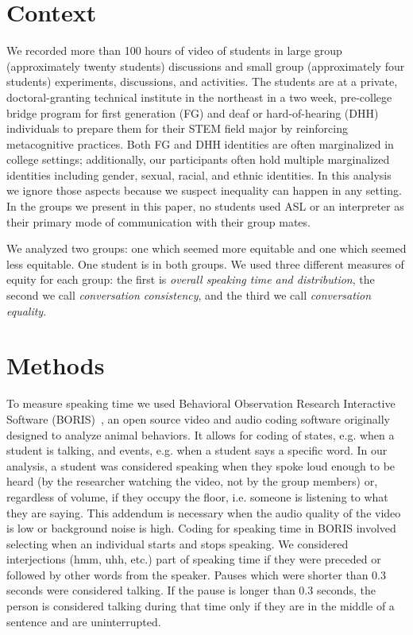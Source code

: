 \documentclass[aps,pra,reprint,noshowpacs,superscriptaddress, nofootinbib]{revtex4-1}
\begin{document}
\section{Context}

   We recorded more than 100 hours of video of students in large group (approximately twenty students) discussions and small group (approximately four students) experiments, discussions, and activities. The students are at a private, doctoral-granting technical institute in the northeast in a two week, pre-college bridge program for first generation (FG) and deaf or hard-of-hearing (DHH) individuals to prepare them for their STEM field major by reinforcing metacognitive practices. Both FG and DHH identities are often marginalized in college settings; additionally, our participants often hold multiple marginalized identities including gender, sexual, racial, and ethnic identities. In this analysis we ignore those aspects because we suspect inequality can happen in any setting. In the groups we present in this paper, no students used ASL or an interpreter as their primary mode of communication with their group mates. 
   
      We analyzed two groups: one which seemed more equitable and one which seemed less equitable. One student is in both groups. We used three different measures of equity for each group: the first is \textit{overall speaking time and distribution}, the second we call \textit{conversation consistency}, and the third we call \textit{conversation equality}.

\section{Methods}


To measure speaking time we used Behavioral Observation Research Interactive Software (BORIS)~\cite{friard_boris:_2016}, an open source video and audio coding software originally designed to analyze animal behaviors. It allows for coding of states, e.g. when a student is talking, and events, e.g. when a student says a specific word. In our analysis, a student was considered speaking when they spoke loud enough to be heard (by the researcher watching the video, not by the group members) or, regardless of volume, if they occupy the floor, i.e. someone is listening to what they are saying. This addendum is necessary when the audio quality of the video is low or background noise is high. Coding for speaking time in BORIS involved selecting when an individual starts and stops speaking. We considered interjections (hmm, uhh, etc.) part of speaking time if they were preceded or followed by other words from the speaker. Pauses which were shorter than 0.3 seconds were considered talking. If the pause is longer than 0.3 seconds, the person is considered talking during that time only if they are in the middle of a sentence and are uninterrupted. 
\end{document}
